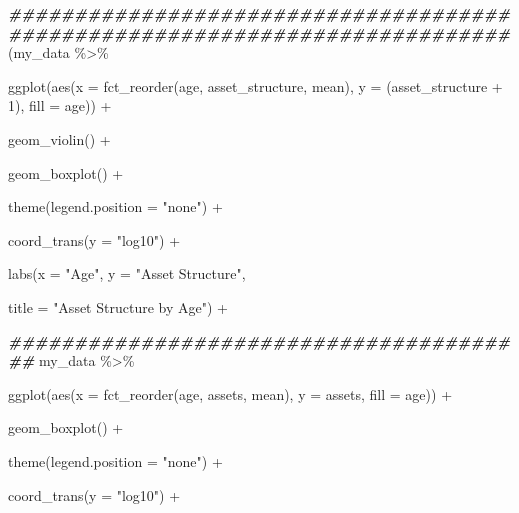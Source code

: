 \documentclass[a4paper,nobind]{templates/ociamthesis}
\newenvironment{Shaded}{\begin{snugshade}}{\end{snugshade}}
\newcommand{\AttributeTok}[1]{\textcolor[rgb]{0.77,0.63,0.00}{#1}}
\newcommand{\DecValTok}[1]{\textcolor[rgb]{0.00,0.00,0.81}{#1}}
\newcommand{\DocumentationTok}[1]{\textcolor[rgb]{0.56,0.35,0.01}{\textbf{\textit{#1}}}}
\newcommand{\FunctionTok}[1]{\textcolor[rgb]{0.00,0.00,0.00}{#1}}
\newcommand{\NormalTok}[1]{#1}
\newcommand{\SpecialCharTok}[1]{\textcolor[rgb]{0.00,0.00,0.00}{#1}}
\newcommand{\StringTok}[1]{\textcolor[rgb]{0.31,0.60,0.02}{#1}}
\renewenvironment{Shaded}
{
  \vspace{10pt}%
  \begin{snugshade}%
}{%
  \end{snugshade}%
  \vspace{8pt}%
}
\begin{document}
\begin{landscape}

\begin{Shaded}
\begin{Highlighting}[]
\DocumentationTok{\#\#\#\#\#\#\#\#\#\#\#\#\#\#\#\#\#\#\#\#\#\#\#\#\#\#\#\#\#\#\#\#\#\#\#\#\#\#}
\DocumentationTok{\#\#\#\#\#\#\#\#\#\#\#\#\#\#\#\#\#\#\#\#\#\#\#\#\#\#\#\#\#\#\#\#\#\#\#\#\#\#}
\NormalTok{(my\_data }\SpecialCharTok{\%\textgreater{}\%} 
  
  \FunctionTok{ggplot}\NormalTok{(}\FunctionTok{aes}\NormalTok{(}\AttributeTok{x =} \FunctionTok{fct\_reorder}\NormalTok{(age, asset\_structure, mean), }\AttributeTok{y =}\NormalTok{ (asset\_structure }\SpecialCharTok{+} \DecValTok{1}\NormalTok{), }\AttributeTok{fill =}\NormalTok{ age)) }\SpecialCharTok{+} 
   
  \FunctionTok{geom\_violin}\NormalTok{() }\SpecialCharTok{+}
  
  \FunctionTok{geom\_boxplot}\NormalTok{() }\SpecialCharTok{+} 
  
  \FunctionTok{theme}\NormalTok{(}\AttributeTok{legend.position =} \StringTok{"none"}\NormalTok{) }\SpecialCharTok{+} 
  
  \FunctionTok{coord\_trans}\NormalTok{(}\AttributeTok{y =} \StringTok{"log10"}\NormalTok{) }\SpecialCharTok{+} 
   
  \FunctionTok{labs}\NormalTok{(}\AttributeTok{x =} \StringTok{"Age"}\NormalTok{, }\AttributeTok{y =} \StringTok{"Asset Structure"}\NormalTok{, }
       
       \AttributeTok{title =} \StringTok{"Asset Structure by Age"}\NormalTok{) }\SpecialCharTok{+}
   
   

\DocumentationTok{\#\#\#\#\#\#\#\#\#\#\#\#\#\#\#\#\#\#\#\#\#\#\#\#\#\#\#\#\#\#\#\#\#\#\#\#\#\#\#\#}
\NormalTok{my\_data }\SpecialCharTok{\%\textgreater{}\%} 
  
  \FunctionTok{ggplot}\NormalTok{(}\FunctionTok{aes}\NormalTok{(}\AttributeTok{x =} \FunctionTok{fct\_reorder}\NormalTok{(age, assets, mean), }\AttributeTok{y =}\NormalTok{ assets, }\AttributeTok{fill =}\NormalTok{ age)) }\SpecialCharTok{+} 
  
  \FunctionTok{geom\_boxplot}\NormalTok{() }\SpecialCharTok{+} 
  
  \FunctionTok{theme}\NormalTok{(}\AttributeTok{legend.position =} \StringTok{"none"}\NormalTok{) }\SpecialCharTok{+} 
  
  \FunctionTok{coord\_trans}\NormalTok{(}\AttributeTok{y =} \StringTok{"log10"}\NormalTok{) }\SpecialCharTok{+} 
  

\end{Highlighting}
\end{Shaded}
\end{landscape}
\end{document}
